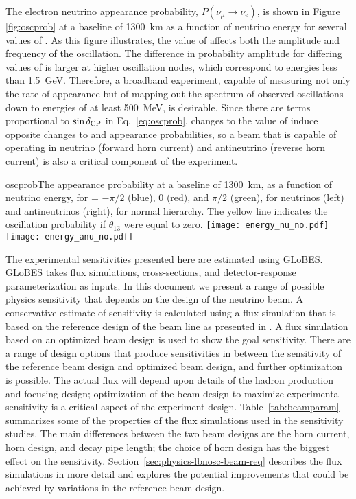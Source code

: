 The electron neutrino appearance probability, $P(\nu_\mu \rightarrow \nu_e)$, 
is shown in 
Figure \ref{fig:oscprob} 
at a baseline of 1300~km as a function of neutrino 
energy for several values of \deltacp. As this figure illustrates, the value 
of \deltacp affects both the amplitude and frequency of
the oscillation. The difference in probability amplitude
for differing values of \deltacp is larger at higher oscillation nodes, which 
correspond to energies less than 1.5~GeV. Therefore, a broadband experiment, 
capable of measuring not only the rate of \nue appearance but of mapping out the 
spectrum of observed oscillations down to energies of at least 500~MeV, 
is desirable. Since there are terms proportional to $\sin\mdeltacp$ in Eq.~\ref{eq:oscprob},
changes to the value of \deltacp induce opposite changes to \nue and
\anue appearance probabilities, so a beam that is capable of operating in
neutrino (forward horn current) and antineutrino (reverse horn current)
is also a critical component of the experiment.

\begin{cdrfigure}{oscprob}{The appearance probability at a baseline of 1300~km,
  as a function of neutrino energy, for \deltacp = $-\pi/2$ (blue), 
  0 (red), and $\pi/2$ (green), for neutrinos (left) and antineutrinos
  (right), for normal hierarchy. The yellow line indicates the oscillation
  probability if $\theta_{13}$ were equal to zero.}
\texttt{[image: energy\_nu\_no.pdf]}
\texttt{[image: energy\_anu\_no.pdf]}
\end{cdrfigure}

The experimental sensitivities presented here are estimated using 
GLoBES\cite{Huber:2004ka,Huber:2007ji}. GLoBES takes flux simulations, cross-sections,
and detector-response parameterization as inputs. In this document we present
a range of possible physics sensitivity that depends on the design of the neutrino beam.
A conservative estimate of sensitivity is calculated using a flux simulation that is based on the reference design of the beam line as presented in \vollbnf.  A flux simulation based on an optimized beam design is used to show the goal sensitivity.  There are a range of design options that produce sensitivities in between the sensitivity of the reference beam design and optimized beam design, and further optimization is possible. The actual flux will depend upon details of the hadron production and focusing design; optimization of the beam design to maximize experimental sensitivity is a critical aspect of the experiment
design.  Table~\ref{tab:beamparam} summarizes some of the properties of the flux simulations used in the sensitivity studies.  The main differences between the two beam designs are the horn current, horn design, and decay pipe length; the choice of horn design has the biggest effect on the sensitivity. Section~\ref{sec:physics-lbnosc-beam-req} describes the flux simulations in more detail and explores the potential improvements that could be achieved by variations in the reference beam design.

